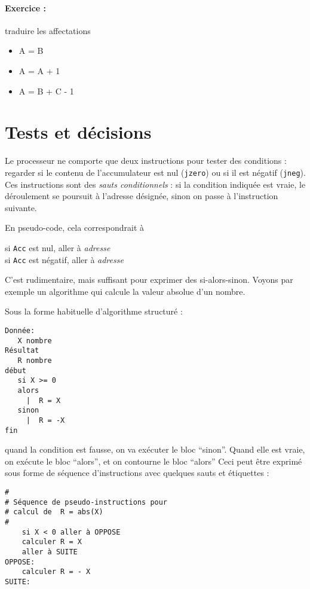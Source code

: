 \documentclass[10pt]{article}
\begin{document}
\paragraph{Exercice : } traduire les affectations
\begin{itemize}
\item A = B
\item A = A + 1
\item A = B + C - 1
\end{itemize}

\section{Tests et décisions}

Le processeur ne comporte que deux instructions pour tester
des conditions : regarder si le contenu de l'accumulateur est
nul (\texttt{jzero}) ou si il est négatif (\texttt{jneg}).
Ces instructions sont des \emph{sauts conditionnels} : si la condition
indiquée est vraie, le déroulement se poursuit à l'adresse désignée,
sinon on passe à l'instruction suivante.

En pseudo-code, cela correspondrait à 
\begin{center}
si \texttt{Acc} est nul, aller à \emph{adresse} \\
si \texttt{Acc} est négatif, aller à \emph{adresse}
\end{center}

C'est rudimentaire, mais suffisant pour exprimer des si-alors-sinon.
Voyons par exemple un algorithme qui calcule la valeur absolue d'un nombre.

Sous la forme habituelle d'algorithme structuré :
\begin{lstlisting}[frame=single]
Donnée:
   X nombre
Résultat
   R nombre 
début
   si X >= 0
   alors
     |  R = X
   sinon
     |  R = -X
fin
\end{lstlisting}

quand la condition est fausse, on va exécuter le bloc ``sinon''. 
Quand elle est vraie, on exécute le bloc ``alors'', et on contourne
le bloc ``alors''
Ceci peut être exprimé sous forme de séquence d'instructions 
avec quelques sauts et étiquettes :
\begin{lstlisting}[frame=single]
#
# Séquence de pseudo-instructions pour
# calcul de  R = abs(X)
#
    si X < 0 aller à OPPOSE
    calculer R = X
    aller à SUITE
OPPOSE:
    calculer R = - X    
SUITE:
\end{lstlisting}
\end{document}
